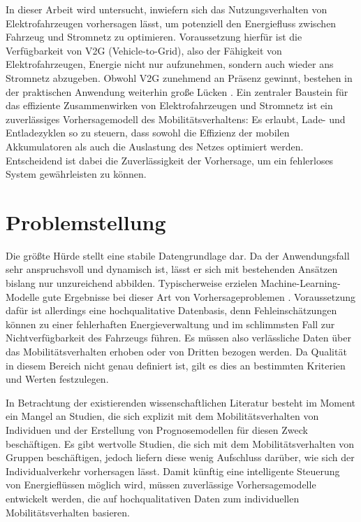 In dieser Arbeit wird untersucht, inwiefern sich das Nutzungsverhalten von Elektrofahrzeugen vorhersagen lässt, um potenziell den Energiefluss zwischen Fahrzeug und Stromnetz zu optimieren. Voraussetzung hierfür ist die Verfügbarkeit von V2G (Vehicle-to-Grid), also der Fähigkeit von Elektrofahrzeugen, Energie nicht nur aufzunehmen, sondern auch wieder ans Stromnetz abzugeben. Obwohl V2G zunehmend an Präsenz gewinnt, bestehen in der praktischen Anwendung weiterhin große Lücken \parencite{sovacool2020actors}. Ein zentraler Baustein für das effiziente Zusammenwirken von Elektrofahrzeugen und Stromnetz ist ein zuverlässiges Vorhersagemodell des Mobilitätsverhaltens: Es erlaubt, Lade- und Entladezyklen so zu steuern, dass sowohl die Effizienz der mobilen Akkumulatoren als auch die Auslastung des Netzes optimiert werden. Entscheidend ist dabei die Zuverlässigkeit der Vorhersage, um ein fehlerloses System gewährleisten zu können.
\section{Problemstellung}
\label{sec:problemstellung}

Die größte Hürde stellt eine stabile Datengrundlage dar. Da der Anwendungsfall sehr anspruchsvoll und dynamisch ist, lässt er sich mit bestehenden Ansätzen bislang nur unzureichend abbilden. Typischerweise erzielen Machine-Learning-Modelle gute Ergebnisse bei dieser Art von Vorhersageproblemen \parencite{khwaja2021performance,frendo2021improving}. Voraussetzung dafür ist allerdings eine hochqualitative Datenbasis, denn Fehleinschätzungen können zu einer fehlerhaften Energieverwaltung und im schlimmsten Fall zur Nichtverfügbarkeit des Fahrzeugs führen. Es müssen also verlässliche Daten über das Mobilitätsverhalten erhoben oder von Dritten bezogen werden. Da Qualität in diesem Bereich nicht genau definiert ist, gilt es dies an bestimmten Kriterien und Werten festzulegen.

In Betrachtung der existierenden wissenschaftlichen Literatur besteht im Moment ein Mangel an Studien, die sich explizit mit dem Mobilitätsverhalten von Individuen und der Erstellung von Prognosemodellen für diesen Zweck beschäftigen. Es gibt wertvolle Studien, die sich mit dem Mobilitätsverhalten von Gruppen beschäftigen, jedoch liefern diese wenig Aufschluss darüber, wie sich der Individualverkehr vorhersagen lässt. Damit künftig eine intelligente Steuerung von Energieflüssen möglich wird, müssen zuverlässige Vorhersagemodelle entwickelt werden, die auf hochqualitativen Daten zum individuellen Mobilitätsverhalten basieren. 

